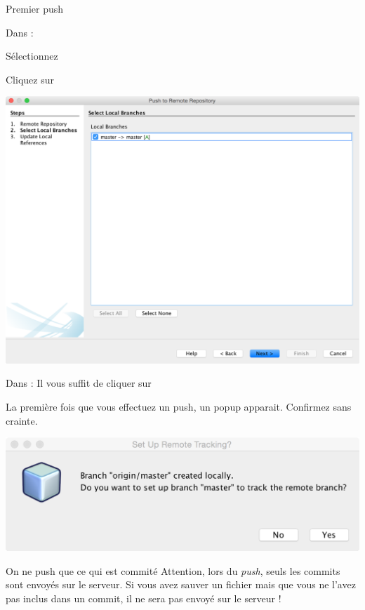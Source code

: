 \documentclass[a4paper,11pt]{style-esi/td}
\begin{document}
\begin{Tutoriel}{Premier push}
\begin{steps}
\begin{steps}
\begin{center}
			\end{center}		
		\end{steps}
	\item 
		Dans  : 
		\begin{steps}
			\item Sélectionnez 
			\item Cliquez sur 
			\begin{center}
				\includegraphics[width=.5\textwidth]{image/NetBeans_Push06.png}
			\end{center}		
		\end{steps}
	\item 
		Dans  : 
		Il vous suffit de cliquer sur 

		La première fois que vous effectuez un push, un popup apparait.
		Confirmez sans crainte.
		\begin{center}
			\includegraphics[width=.5\textwidth]{image/NetBeans_Push08.png}
		\end{center}
	\end{steps}
\end{Tutoriel}

\begin{alertit}{On ne push que ce qui est commité}
	Attention,
	lors du \emph{push}, 
	seuls les commits sont envoyés sur le serveur.
	Si vous avez sauver un fichier 
	mais que vous ne l'avez pas inclus dans un commit,
	il ne sera pas envoyé sur le serveur !
\end{alertit}
\end{document}
